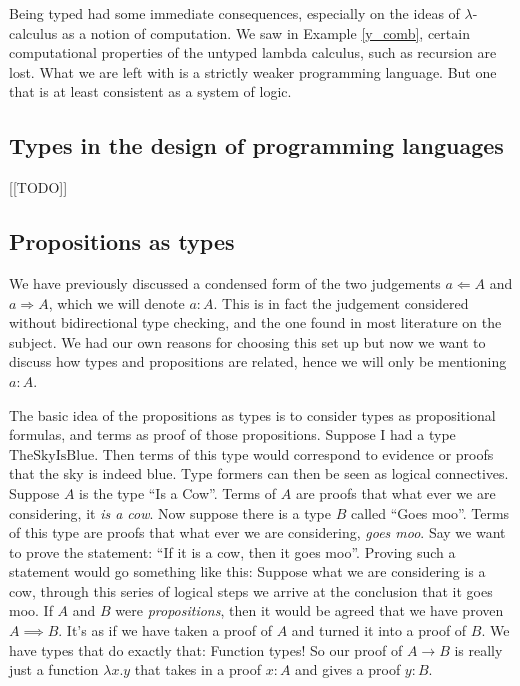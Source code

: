 Being typed had some immediate consequences, especially on the ideas of $\lambda$-calculus as a notion of computation. We saw in Example \ref{y_comb}, certain computational properties of the untyped lambda calculus, such as recursion are lost. What we are left with is a strictly weaker programming language. But one that is at least consistent as a system of logic.

\subsection{Types in the design of programming languages}

[[TODO]]

\subsection{Propositions as types}

We have previously discussed a condensed form of the two judgements $a \Leftarrow A$ and $a \Rightarrow A$, which we will denote $a : A$. This is in fact the judgement considered without bidirectional type checking, and the one found in most literature on the subject. We had our own reasons for choosing this set up but now we want to discuss how types and propositions are related, hence we will only be mentioning $a : A$.

The basic idea of the propositions as types is to consider types as propositional formulas, and terms as proof of those propositions. Suppose I had a type $\mathrm{TheSkyIsBlue}$. Then terms of this type would correspond to evidence or proofs that the sky is indeed blue. Type formers can then be seen as logical connectives. Suppose $A$ is the type ``Is a Cow''. Terms of $A$ are proofs that what ever we are considering, it \emph{is a cow}. Now suppose there is a type $B$ called ``Goes moo''. Terms of this type are proofs that what ever we are considering, \emph{goes moo}. Say we want to prove the statement: ``If it is a cow, then it goes moo''.
Proving such a statement would go something like this: Suppose what we are considering is a cow, through this series of logical steps we arrive at the conclusion that it goes moo.
If $A$ and $B$ were \emph{propositions}, then it would be agreed that we have proven $A \implies B$. It's as if we have taken a proof of $A$ and turned it into a proof of $B$. We have types that do exactly that: Function types!
So our proof of $A \to B$ is really just a function $\lambda x . y$ that takes in a proof $x : A$ and gives a proof $y : B$.

